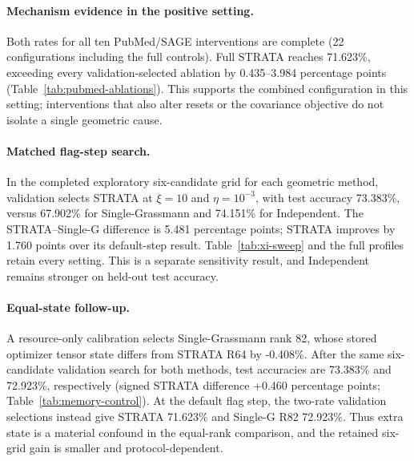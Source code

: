 \paragraph{Mechanism evidence in the positive setting.} Both rates for all ten PubMed/SAGE interventions are complete (22 configurations including the full controls). Full STRATA reaches 71.623\%, exceeding every validation-selected ablation by 0.435--3.984 percentage points (Table~\ref{tab:pubmed-ablations}). This supports the combined configuration in this setting; interventions that also alter resets or the covariance objective do not isolate a single geometric cause.
\paragraph{Matched flag-step search.} In the completed exploratory six-candidate grid for each geometric method, validation selects STRATA at $\xi=10$ and $\eta=10^{-3}$, with test accuracy 73.383\%, versus 67.902\% for Single-Grassmann and 74.151\% for Independent. The STRATA--Single-G difference is 5.481 percentage points; STRATA improves by 1.760 points over its default-step result. Table~\ref{tab:xi-sweep} and the full profiles retain every setting. This is a separate sensitivity result, and Independent remains stronger on held-out test accuracy.
\paragraph{Equal-state follow-up.} A resource-only calibration selects Single-Grassmann rank 82, whose stored optimizer tensor state differs from STRATA R64 by -0.408\%. After the same six-candidate validation search for both methods, test accuracies are 73.383\% and 72.923\%, respectively (signed STRATA difference +0.460 percentage points; Table~\ref{tab:memory-control}). At the default flag step, the two-rate validation selections instead give STRATA 71.623\% and Single-G R82 72.923\%. Thus extra state is a material confound in the equal-rank comparison, and the retained six-grid gain is smaller and protocol-dependent.
